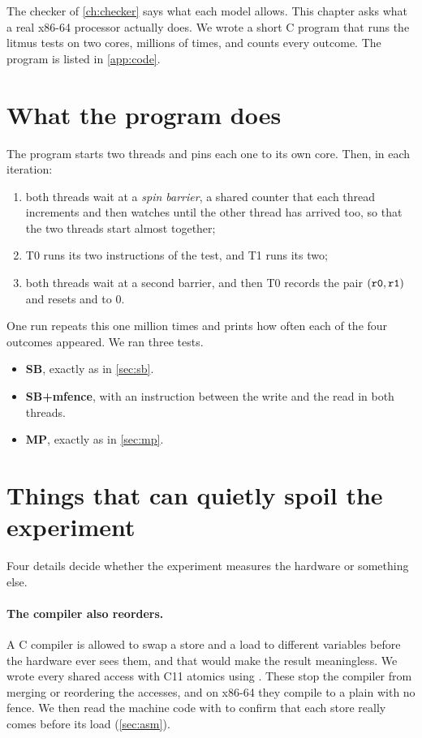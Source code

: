 The checker of \cref{ch:checker} says what each model allows. This chapter asks what a real x86-64 processor actually does. We wrote a short C program that runs the litmus tests on two cores, millions of times, and counts every outcome. The program is listed in \cref{app:code}.

\section{What the program does}
\label{sec:harness}

The program starts two threads and pins each one to its own core. Then, in each iteration:
\begin{enumerate}
\item both threads wait at a \emph{spin barrier}, a shared counter that each thread increments and then watches until the other thread has arrived too, so that the two threads start almost together;
\item T0 runs its two instructions of the test, and T1 runs its two;
\item both threads wait at a second barrier, and then T0 records the pair $(\texttt{r0}, \texttt{r1})$ and resets  and  to 0.
\end{enumerate}
One run repeats this one million times and prints how often each of the four outcomes appeared. We ran three tests.
\begin{itemize}
\item \textbf{SB}, exactly as in \cref{sec:sb}.
\item \textbf{SB+mfence}, with an  instruction between the write and the read in both threads.
\item \textbf{MP}, exactly as in \cref{sec:mp}.
\end{itemize}

\section{Things that can quietly spoil the experiment}
\label{sec:pitfalls}

Four details decide whether the experiment measures the hardware or something else.

\paragraph{The compiler also reorders.} A C compiler is allowed to swap a store and a load to different variables before the hardware ever sees them, and that would make the result meaningless. We wrote every shared access with C11 atomics using . These stop the compiler from merging or reordering the accesses, and on x86-64 they compile to a plain  with no fence. We then read the machine code with  to confirm that each store really comes before its load (\cref{sec:asm}).

